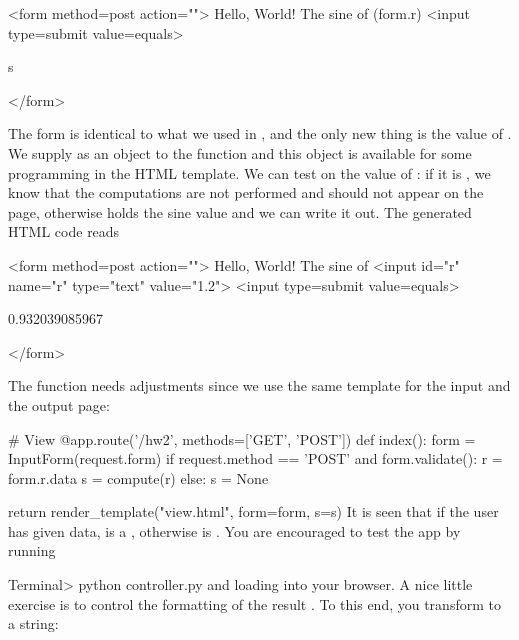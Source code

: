 \documentclass[%
oneside,                 %
final,                   %
10pt]{article}
\begin{document}
\bhtmlpro
<form method=post action="">
  Hello, World! The sine of
  {{(form.r)}}
  <input type=submit value=equals>
{%
{{s}}
{%
</form>
\ehtmlpro

The form is identical to what we used in , and the only
new thing is the value of . We supply  as an object to the
 function and this object is available for
some programming in the HTML template. We can test on the value of :
if it is , we know that the computations are not performed and
 should not appear on the page, otherwise  holds the sine
value and we can write it out. The generated HTML code reads

\bhtml
<form method=post action="">
  Hello, World! The sine of
  <input id="r" name="r" type="text" value="1.2">
  <input type=submit value=equals>

0.932039085967

</form>
\ehtml

The  function needs adjustments since we use the same
template for the input and the output page:

\bpycod
# View
@app.route('/hw2', methods=['GET', 'POST'])
def index():
    form = InputForm(request.form)
    if request.method == 'POST' and form.validate():
        r = form.r.data
        s = compute(r)
    else:
        s = None

    return render_template("view.html", form=form, s=s)
\epycod
It is seen that if the user has given data,  is a , otherwise
 is . You are encouraged to test the app by running

\bsys
Terminal> python controller.py
\esys
and loading  into your browser.
A nice little exercise is to control the formatting of the result .
To this end, you transform  to a string: \code{s = '%
sending it to \code{render_template}.

\subsection{Splitting the app into model, view, and controller files}
\label{wf:hw3:flask}



\index{Flask!MVC pattern}

In our previous to Flask apps we have had the model, view, and
controller parts in one file \code{controller.py}. For illustration we
may split the previous \code{controller.py} into three files:
\code{model.py}, \code{view.py}, and \code{controller.py}, located in a
directory \code{hw3_flask}. The contents
in these files reflects the splitting introduced in the original
scienticic hello world program in Section~\ref{wf:hw:mvc}.
In the Flask context we have \code{model.py} as

}}}
\end{document}
